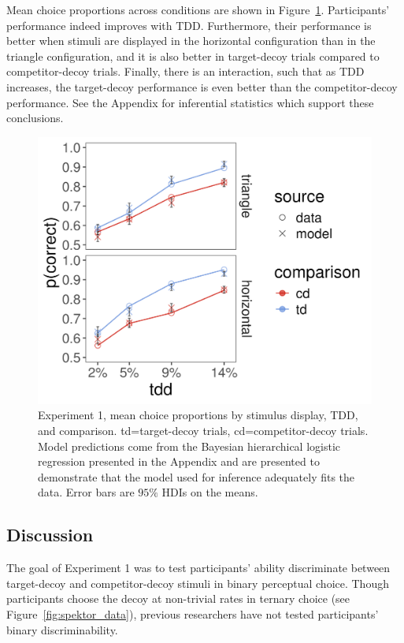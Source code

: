 Mean choice proportions across conditions are shown in Figure~\ref{fig:e1_data}. Participants' performance indeed improves with TDD. Furthermore, their performance is better when stimuli are displayed in the horizontal configuration than in the triangle configuration, and it is also better in target-decoy trials compared to competitor-decoy trials. Finally, there is an interaction, such that as TDD increases, the target-decoy performance is even better than the competitor-decoy performance. See the Appendix for inferential statistics which support these conclusions.

\begin{figure}
   \centering
   \includegraphics[width=\textwidth]{figures/m14_model_preds_v_data.jpeg}
   \caption{Experiment 1, mean choice proportions by stimulus display, TDD, and comparison. td=target-decoy trials, cd=competitor-decoy trials. Model predictions come from the Bayesian hierarchical logistic regression presented in the Appendix and are presented to demonstrate that the model used for inference adequately fits the data. Error bars are $95\%$ HDIs on the means.}
   \label{fig:e1_data}
\end{figure}

\subsection{Discussion}

The goal of Experiment 1 was to test participants' ability discriminate between target-decoy and competitor-decoy stimuli in binary perceptual choice. Though participants choose the decoy at non-trivial rates in ternary choice (see Figure~\ref{fig:spektor_data}), previous researchers have not tested participants' binary discriminability. 

